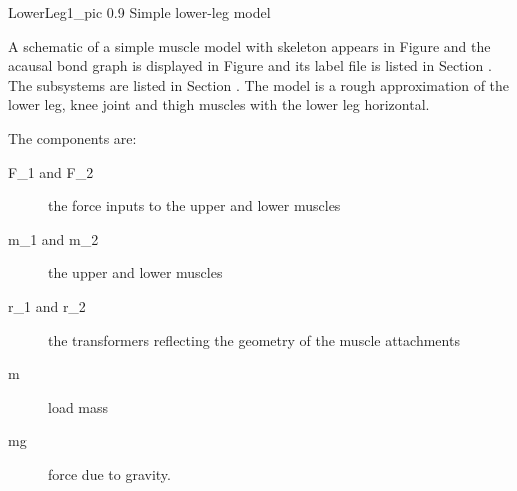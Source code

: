 

    {LowerLeg1_pic}
    {0.9}
    {Simple lower-leg model}
   
    A schematic of a simple muscle model with skeleton appears in
    Figure  and the acausal bond graph is
    displayed in Figure  and its label file
    is listed in Section .  The subsystems
    are listed in Section .  The model is a
    rough approximation of the lower leg, knee joint and thigh muscles
    with the lower leg horizontal.

    The components are:
    \begin{description}
    \item[F\_1 and F\_2] the force inputs to the upper and lower muscles
    \item[m\_1 and m\_2] the upper and lower muscles
    \item[r\_1 and r\_2] the transformers reflecting the geometry of the
      muscle attachments
    \item[m] load mass
    \item[mg] force due to gravity.
    \end{description}

